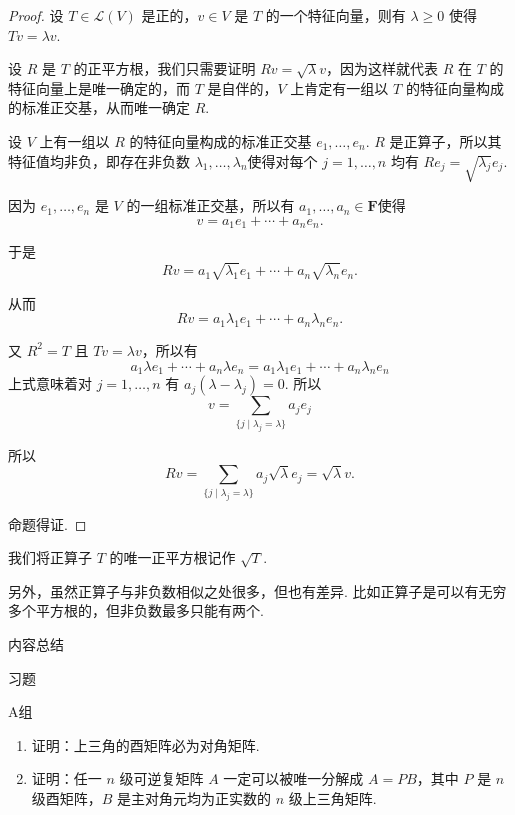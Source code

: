 \begin{proof}
    设 $ T \in \mathcal{L}(V) $ 是正的，$ v \in V $ 是 $ T $ 的一个特征向量，则有 $ \lambda \geqslant 0 $ 使得 $ Tv = \lambda v $.

    设 $ R $ 是 $ T $ 的正平方根，我们只需要证明 $ Rv = \sqrt{\lambda} v $，因为这样就代表 $ R $ 在 $ T $ 的特征向量上是唯一确定的，而 $ T $ 是自伴的，$ V $ 上肯定有一组以 $ T $ 的特征向量构成的标准正交基，从而唯一确定 $ R $.

    设 $ V $ 上有一组以 $ R $ 的特征向量构成的标准正交基 $ e_1, \ldots , e_n $. $ R $ 是正算子，所以其特征值均非负，即存在非负数 $\lambda_1, \ldots , \lambda_n $使得对每个 $ j = 1, \ldots , n $ 均有 $ Re_j = \sqrt{\lambda_j}e_j $.

    因为 $ e_1, \ldots , e_n $ 是 $ V $ 的一组标准正交基，所以有 $ a_1, \ldots , a_n \in \mathbf{F} $使得
    \[ v = a_1e_1 + \cdots + a_ne_n. \]

    于是
    \[ Rv = a_1\sqrt{\lambda_1}e_1 + \cdots + a_n\sqrt{\lambda_n}e_n. \]

    从而
    \[ Rv = a_1\lambda_1e_1 + \cdots + a_n\lambda_ne_n. \]

    又 $ R^{2} = T $ 且 $ Tv = \lambda v $，所以有
    \[ a_1\lambda e_1 + \cdots + a_n\lambda e_n = a_1\lambda_1e_1 + \cdots + a_n\lambda_ne_n \]
    上式意味着对 $ j = 1, \ldots, n $ 有 $ a_j(\lambda - \lambda_j) = 0 $. 所以
    \[ v = \sum_{\{j \mid \lambda_j = \lambda \}} a_je_j \]

    所以
    \[ Rv = \sum_{\{j \mid \lambda_j = \lambda \}} a_j\sqrt{\lambda}e_j = \sqrt{\lambda}v. \]

    命题得证.
\end{proof}

我们将正算子 $ T $ 的唯一正平方根记作 $ \sqrt{T} $.

另外，虽然正算子与非负数相似之处很多，但也有差异. 比如正算子是可以有无穷多个平方根的，但非负数最多只能有两个.

\vspace{2ex}
\centerline{\heiti \Large 内容总结}

\vspace{2ex}
\centerline{\heiti \Large 习题}

\vspace{2ex}
{\kaishu }
\begin{flushright}
    \kaishu

\end{flushright}

\centerline{\heiti A组}
\begin{enumerate}
    \item 证明：上三角的酉矩阵必为对角矩阵.

    \item 证明：任一 $ n $ 级可逆复矩阵 $ A $ 一定可以被唯一分解成 $ A = PB $，其中 $ P $ 是 $ n $ 级酉矩阵，$ B $ 是主对角元均为正实数的 $ n $ 级上三角矩阵.
\end{enumerate}

